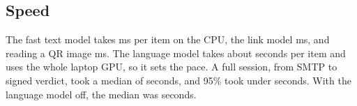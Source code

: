 \subsection{Speed}

The fast text model takes \msPerText{} ms per item on the CPU, the link model \linkMs{} ms, and reading a QR image \qrMs{} ms. The language model takes about \sampleSeconds{} seconds per item and uses the whole laptop GPU, so it sets the pace. A full session, from SMTP to signed verdict, took a median of \systemMedian{} seconds, and 95\% took under \systemPninetyfive{} seconds. With the language model off, the median was \fastSystemMedian{} seconds.
